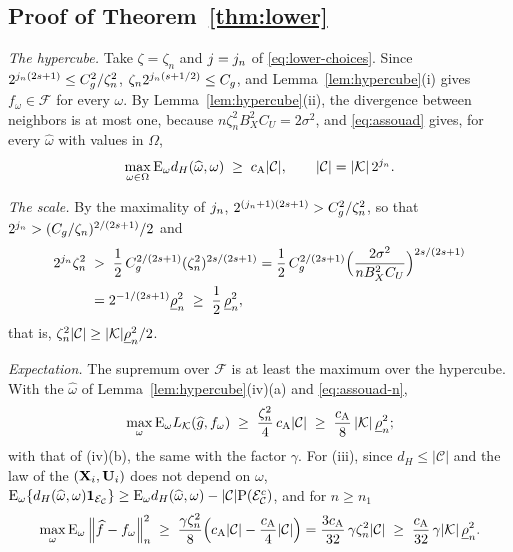 \subsection*{Proof of Theorem~\ref{thm:lower}}

\emph{The hypercube.} Take $\zeta = \zeta_n$ and $j = j_n$ of
\eqref{eq:lower-choices}. Since $2^{j_n(2s+1)} \le C_g^{2}/\zeta_n^{2}$,
$\zeta_n2^{j_n(s+1/2)} \le C_g$, and Lemma~\ref{lem:hypercube}(i) gives
$f_{\omega} \in \mathcal{F}$ for every $\omega$. By
Lemma~\ref{lem:hypercube}(ii), the divergence between neighbors is at most one,
because $n\zeta_n^{2}B_X^{2}C_U = 2\sigma^{2}$, and
\eqref{eq:assouad} gives, for every $\widehat\omega$ with values in $\Omega$,
\begin{equation}
  \label{eq:assouad-n}
  \max_{\omega\in\Omega}\mathrm{E}_{\omega}d_{H}(\widehat\omega,\omega)
  \;\ge\; c_{\mathrm{A}}|\mathcal{C}|,
  \qquad |\mathcal{C}| = |\mathcal{K}|\,2^{j_n} .
\end{equation}

\emph{The scale.} By the maximality of $j_n$,
$2^{(j_n+1)(2s+1)} > C_g^{2}/\zeta_n^{2}$, so that
$2^{j_n} > (C_g/\zeta_n)^{2/(2s+1)}/2$ and
\begin{align*}
  2^{j_n}\zeta_n^{2} \;&>\; \frac12\,C_g^{2/(2s+1)}(\zeta_n^{2})^{2s/(2s+1)}
  = \frac12\,C_g^{2/(2s+1)}\Bigl(\frac{2\sigma^{2}}{nB_X^{2}C_U}\Bigr)^{2s/(2s+1)}
  \\
  &= 2^{-1/(2s+1)}\underline{\rho}_{n}^{2} \;\ge\; \frac12\,\underline{\rho}_{n}^{2},
\end{align*}
that is, $\zeta_n^{2}|\mathcal{C}| \ge |\mathcal{K}|\underline{\rho}_{n}^{2}/2$.

\emph{Expectation.} The supremum over $\mathcal{F}$ is at least the maximum
over the hypercube. With the $\widehat\omega$ of
Lemma~\ref{lem:hypercube}(iv)(a) and \eqref{eq:assouad-n},
\[
  \max_{\omega}\mathrm{E}_{\omega}L_{\mathcal{K}}(\widehat{g},f_{\omega}) \;\ge\;
  \frac{\zeta_n^{2}}{4}\,c_{\mathrm{A}}|\mathcal{C}| \;\ge\; \frac{c_{\mathrm{A}}}{8}\,|\mathcal{K}|\,\underline{\rho}_{n}^{2} ;
\]
with that of (iv)(b), the same with the factor $\gamma$. For (iii), since
$d_{H} \le |\mathcal{C}|$ and the law of the $(\mathbf{X}_i,\mathbf{U}_i)$ does not depend
on $\omega$, $\mathrm{E}_{\omega}\{d_{H}(\widehat\omega,\omega)\mathbf{1}_{\mathcal{E}_{\mathcal{C}}}\}
\ge \mathrm{E}_{\omega}d_{H}(\widehat\omega,\omega) -
|\mathcal{C}|\mathrm{P}(\mathcal{E}_{\mathcal{C}}^{c})$, and for $n \ge n_{1}$
\[
  \max_{\omega}\mathrm{E}_{\omega}\left\lVert \widehat{f}-f_{\omega} \right\rVert_{n}^{2}
  \;\ge\; \frac{\gamma\zeta_n^{2}}{8}\Bigl(c_{\mathrm{A}}|\mathcal{C}| -
  \frac{c_{\mathrm{A}}}{4}|\mathcal{C}|\Bigr)
  = \frac{3c_{\mathrm{A}}}{32}\,\gamma\zeta_n^{2}|\mathcal{C}|
  \;\ge\; \frac{c_{\mathrm{A}}}{32}\,\gamma|\mathcal{K}|\,\underline{\rho}_{n}^{2} .
\]


